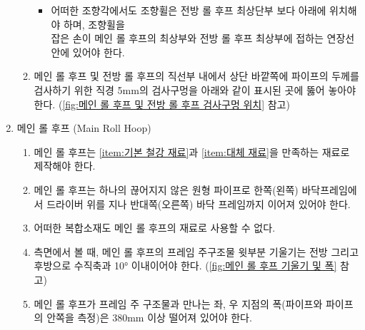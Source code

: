 \documentclass[final,a4paper,10pt]{report}
\begin{document}
\begin{enumerate}
\begin{enumerate}
      \begin{itemize}
        \item 어떠한 조향각에서도 조향휠은 전방 롤 후프 최상단부 보다 아래에 위치해야 하며, 조향휠을\\
        잡은 손이 메인 롤 후프의 최상부와 전방 롤 후프 최상부에 접하는 연장선 안에 있어야 한다.
      \end{itemize}
      
      
      \item 메인 롤 후프 및 전방 롤 후프의 직선부 내에서 상단 바깥쪽에 파이프의 두께를 검사하기 위한 직경 5mm의 검사구멍을 아래와 같이 표시된 곳에 뚫어 놓아야 한다. (\cref{fig:메인 롤 후프 및 전방 롤 후프 검사구멍 위치} 참고)
    \end{enumerate}
    
  \item 메인 롤 후프 (Main Roll Hoop) \label{item:메인 롤 후프}
    \begin{enumerate}
      \item 메인 롤 후프는 \cref{item:기본 철강 재료}과 \cref{item:대체 재료}을 만족하는 재료로 제작해야 한다.
      \item 메인 롤 후프는 하나의 끊어지지 않은 원형 파이프로 한쪽(왼쪽) 바닥프레임에서 드라이버 위를 지나 반대쪽(오른쪽) 바닥 프레임까지 이어져 있어야 한다.
      \item 어떠한 복합소재도 메인 롤 후프의 재료로 사용할 수 없다.
      \item 측면에서 볼 때, 메인 롤 후프의 프레임 주구조물 윗부분 기울기는 전방 그리고 후방으로 수직축과 10° 이내이어야 한다. (\cref{fig:메인 롤 후프 기울기 및 폭} 참고)
      
      
      \item 메인 롤 후프가 프레임 주 구조물과 만나는 좌, 우 지점의 폭(파이프와 파이프의 안쪽을 측정)은 380mm 이상 떨어져 있어야 한다.
      

\end{enumerate}
\end{enumerate}
\end{document}
